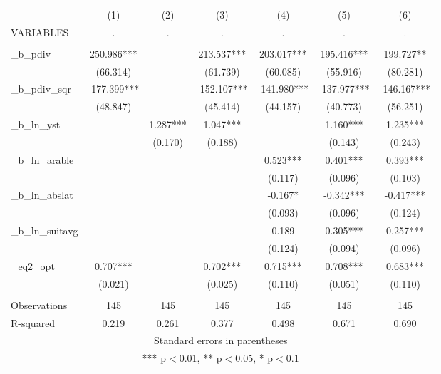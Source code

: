 \documentclass[]{article}
\begin{document}
\begin{tabular}{lcccccc} \hline
 & (1) & (2) & (3) & (4) & (5) & (6) \\
VARIABLES & . & . & . & . & . & . \\ \hline
 &  &  &  &  &  &  \\
\_b\_pdiv & 250.986*** &  & 213.537*** & 203.017*** & 195.416*** & 199.727** \\
 & (66.314) &  & (61.739) & (60.085) & (55.916) & (80.281) \\
\_b\_pdiv\_sqr & -177.399*** &  & -152.107*** & -141.980*** & -137.977*** & -146.167*** \\
 & (48.847) &  & (45.414) & (44.157) & (40.773) & (56.251) \\
\_b\_ln\_yst &  & 1.287*** & 1.047*** &  & 1.160*** & 1.235*** \\
 &  & (0.170) & (0.188) &  & (0.143) & (0.243) \\
\_b\_ln\_arable &  &  &  & 0.523*** & 0.401*** & 0.393*** \\
 &  &  &  & (0.117) & (0.096) & (0.103) \\
\_b\_ln\_abslat &  &  &  & -0.167* & -0.342*** & -0.417*** \\
 &  &  &  & (0.093) & (0.096) & (0.124) \\
\_b\_ln\_suitavg &  &  &  & 0.189 & 0.305*** & 0.257*** \\
 &  &  &  & (0.124) & (0.094) & (0.096) \\
\_eq2\_opt & 0.707*** &  & 0.702*** & 0.715*** & 0.708*** & 0.683*** \\
 & (0.021) &  & (0.025) & (0.110) & (0.051) & (0.110) \\
 &  &  &  &  &  &  \\
Observations & 145 & 145 & 145 & 145 & 145 & 145 \\
 R-squared & 0.219 & 0.261 & 0.377 & 0.498 & 0.671 & 0.690 \\ \hline
\multicolumn{7}{c}{ Standard errors in parentheses} \\
\multicolumn{7}{c}{ *** p$<$0.01, ** p$<$0.05, * p$<$0.1} \\
\end{tabular}
\end{document}
